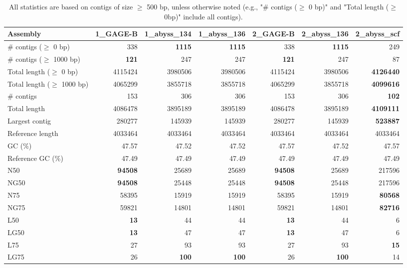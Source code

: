 \documentclass[12pt,a4paper]{article}
\begin{document}
\begin{table}[ht]
\begin{center}
\caption{All statistics are based on contigs of size $\geq$ 500 bp, unless otherwise noted (e.g., "\# contigs ($\geq$ 0 bp)" and "Total length ($\geq$ 0bp)" include all contigs).}
\begin{tabular}{|l*{6}{|r}|}
\hline
Assembly & 1\_GAGE-B & 1\_abyss\_134 & 1\_abyss\_136 & 2\_GAGE-B & 2\_abyss\_136 & 2\_abyss\_scf \\ \hline
\# contigs ($\geq$ 0 bp) & 338 & {\bf 1115} & {\bf 1115} & 338 & {\bf 1115} & 249 \\ \hline
\# contigs ($\geq$ 1000 bp) & {\bf 121} & 247 & 247 & {\bf 121} & 247 & 87 \\ \hline
Total length ($\geq$ 0 bp) & 4115424 & 3980506 & 3980506 & 4115424 & 3980506 & {\bf 4126440} \\ \hline
Total length ($\geq$ 1000 bp) & 4065299 & 3855718 & 3855718 & 4065299 & 3855718 & {\bf 4099616} \\ \hline
\# contigs & 153 & 306 & 306 & 153 & 306 & {\bf 102} \\ \hline
Total length & 4086478 & 3895189 & 3895189 & 4086478 & 3895189 & {\bf 4109111} \\ \hline
Largest contig & 280277 & 145939 & 145939 & 280277 & 145939 & {\bf 523887} \\ \hline
Reference length & 4033464 & 4033464 & 4033464 & 4033464 & 4033464 & 4033464 \\ \hline
GC (\%) & 47.57 & 47.52 & 47.52 & 47.57 & 47.52 & 47.57 \\ \hline
Reference GC (\%) & 47.49 & 47.49 & 47.49 & 47.49 & 47.49 & 47.49 \\ \hline
N50 & {\bf 94508} & 25689 & 25689 & {\bf 94508} & 25689 & 217596 \\ \hline
NG50 & {\bf 94508} & 25448 & 25448 & {\bf 94508} & 25448 & 217596 \\ \hline
N75 & 58395 & 15919 & 15919 & 58395 & 15919 & {\bf 80568} \\ \hline
NG75 & 59821 & 14801 & 14801 & 59821 & 14801 & {\bf 82716} \\ \hline
L50 & {\bf 13} & 44 & 44 & {\bf 13} & 44 & 6 \\ \hline
LG50 & {\bf 13} & 47 & 47 & {\bf 13} & 47 & 6 \\ \hline
L75 & 27 & 93 & 93 & 27 & 93 & {\bf 15} \\ \hline
LG75 & 26 & {\bf 100} & {\bf 100} & 26 & {\bf 100} & 14 \\ \hline

\end{tabular}
\end{center}
\end{table}
\end{document}
